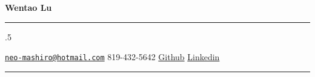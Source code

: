 \documentclass[10pt]{article}
\begin{document}
\centerline{\huge \bf Wentao Lu}

\vspace{2 mm}
\hrule
\vspace{2 mm}


\moveleft.5\hoffset\centerline{
\faEnvelopeO \hspace{1 mm} \href{mailto:}{\href{mailto:neo-mashiro@hotmail.com}{\nolinkurl{neo-mashiro@hotmail.com}}} \hspace{1 mm} \faPhone \hspace{1 mm}  819-432-5642  \hspace{1 mm}  \faGithub \hspace{1 mm} \href{http://github.com/neo-mashiro}{Github} \hspace{1 mm}  \faGlobe \hspace{1 mm} \href{https://www.linkedin.com/in/wentao-lu-90125157}{Linkedin}}

\vspace{2mm}
\hrule
\end{document}
